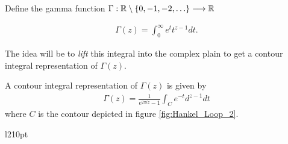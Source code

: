 \begin{mdframed}[innertopmargin=10pt]
\begin{definition}
Define the gamma function $ \Gamma : \mathbb{R} \setminus \{ 0, -1, -2, \ldots \} \longrightarrow \mathbb{R}  $

\begin{align*}
    \Gamma(z) = \int_0^\infty e^t t^{z-1} dt.
\end{align*}
\end{definition}
\end{mdframed}


The idea will be to \emph{lift} this integral into the complex plain to get a contour integral representation of $ \Gamma(z) $.

\begin{mdframed}[innertopmargin=10pt]
\begin{lemma}
    \label{lem:contour_gamma}
    A contour integral representation of $ \Gamma(z) $ is given by
    \begin{align*}
        \Gamma(z) = \frac{1}{e^{2 \pi i z} - 1} \int_{C} e^{-t}d^{z-1} dt
    \end{align*}
where $ C $ is the contour depicted in figure \ref{fig:Hankel_Loop_2}.
\end{lemma}
\end{mdframed}

\begin{wrapfigure}{l}{210pt}
    
    \caption{The Hankel contour C}
    \label{fig:Hankel_Loop_2}
\end{wrapfigure}


